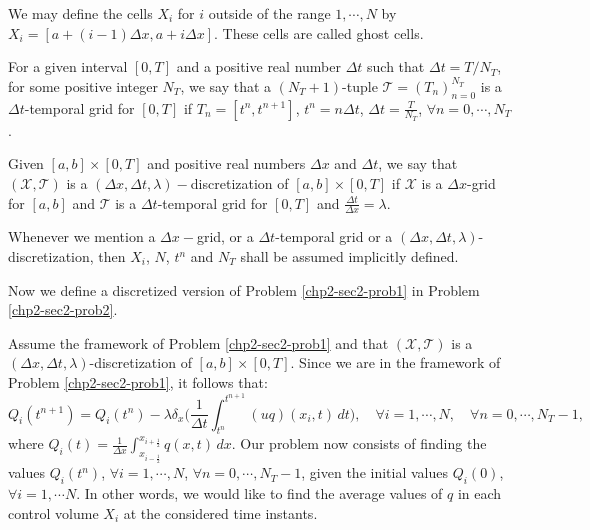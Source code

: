 \begin{remark}
	We may define the cells $X_i$ for $i$ outside of the range $1,\cdots, N$ by 
	$X_i = [a+(i-1)\Delta x,a+i\Delta x]$.  These cells are called ghost cells.
\end{remark}
\begin{definition}
	\label{chp2-def-timegrid}
	For a given interval $[0,T]$ and a positive real number $\Delta t$ such that $\Delta t = T/N_T$, for some positive integer $N_T$,
	we say that a $(N_T+1)$-tuple $\mathcal{T}=(T_n)_{n=0}^{N_T}$ is a $\Delta t$-temporal grid for $[0,T]$ if 
	$ T_n = [t^n, t^{n+1}]$, $t^{n} = n\Delta t$, $\Delta t = \frac{T}{N_T}$, $\forall n = 0, \cdots, N_T$.
\end{definition}
\begin{definition}
	\label{chp2-def-dxtimegrid}
	Given $[a,b]\times [0,T]$ and positive real numbers $\Delta x$ and $\Delta t$, we say that $(\mathcal{X},\mathcal{T})$ is a
	$(\Delta x, \Delta t, \lambda)-$discretization of $[a,b]\times [0,T]$ if $\mathcal{X}$ is a $\Delta x$-grid for $[a,b]$ and
	$\mathcal{T}$ is a $\Delta t$-temporal grid for $[0,T]$ and $\frac{\Delta t}{\Delta x} = \lambda$.
\end{definition}
\begin{remark}
	Whenever we mention a $\Delta x-$grid, or a $\Delta t$-temporal grid or a $(\Delta x,\Delta t, \lambda)$-discretization,
	then $X_i$, $N$, $t^n$ and $N_T$ shall be assumed implicitly defined.
\end{remark}
Now we define a discretized version of Problem \ref{chp2-sec2-prob1}  in Problem \ref{chp2-sec2-prob2}.
\begin{prob}
    \label{chp2-sec2-prob2}
	Assume the framework of Problem \ref{chp2-sec2-prob1}
    and that $(\mathcal{X},\mathcal{T})$ is a $(\Delta x, \Delta t, \lambda)$-discretization of $[a,b]\times [0,T]$.
	Since we are in the framework of Problem \ref{chp2-sec2-prob1}, it follows that:
	\begin{equation}
			\label{1d-fvexact-scheme}
				{Q}_i(t^{n+1}) =  {Q}_i(t^{n}) -
				\lambda \delta _x\bigg( \frac{1}{\Delta t}\int_{t^{n}}^{t^{n+1}}
				{(uq)}(x_{i}, t) \,dt \bigg),
				\quad \forall i = 1, \cdots, N,
				\quad \forall n = 0, \cdots, N_T-1,
	\end{equation}
	where ${Q}_i(t) = \frac{1}{\Delta x}
	\int_{x_{i-\frac{1}{2}}}^{x_{i+\frac{1}{2}}} {q}(x,t) \,dx$.
	Our problem now consists of finding the values ${Q}_i(t^{n})$, 
	$\forall i = 1, \cdots, N$, $\forall n = 0, \cdots, N_T-1$,
	given the initial values ${Q}_i(0)$, $\forall i = 1, \cdots N$.
	In other words, we would like to find the average values of ${q}$
	in each control volume $X_i$ at the considered time instants.
\end{prob}
